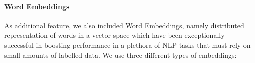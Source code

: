 \documentclass[11pt]{article}
\begin{document}
%
%
%
%
%

\paragraph{Word Embeddings}
As additional feature, we also included Word Embeddings, namely distributed representation of words in a vector space which have been exceptionally successful in boosting performance in a plethora of NLP tasks that must rely on small amounts of labelled data. We use three different types of embeddings: 
\end{document}
